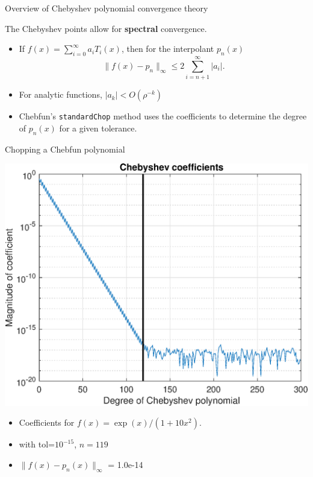 \documentclass{beamer}
\begin{document}
\begin{frame}{Overview of Chebyshev polynomial convergence theory}

The Chebyshev points allow for \textbf{spectral} convergence.

\begin{itemize}
\item If $f(x) = \sum_{i=0}^{\infty} a_i T_i(x)$, then for the interpolant $p_n(x)$ $$ \|f(x) - p_n \|_{\infty} \leq 2 \sum_{i=n+1}^{\infty} |a_i|.$$
\item For analytic functions, $|a_k|<O(\rho^{-k})$
\item Chebfun's {\tt standardChop} method uses the coefficients to determine the degree of $p_n(x)$ for a given tolerance.
\end{itemize}

\end{frame}

\begin{frame}{Chopping a Chebfun polynomial}
\begin{center}
\includegraphics[scale = 0.4]{Cheb15.eps}
\end{center}

\begin{center}
\begin{itemize}
\item \begin{center} Coefficients for $f(x)=\exp(x)/(1+10 x^2)$. \end{center}
\item \begin{center} with tol=$10^{-15}$, $n=119$ \end{center}
\item \begin{center} $\| f(x)-p_n(x) \|_{\infty}$ = 1.0e-14 \end{center}
\end{itemize} 
\end{center}
\end{frame}
\end{document}
